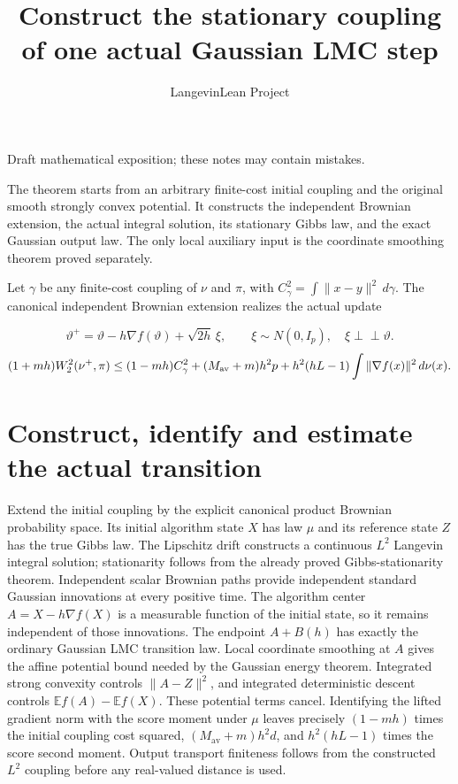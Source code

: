 \documentclass[11pt,a4paper]{article}
\title{\texorpdfstring{Construct the stationary coupling of one actual Gaussian LMC step}{Construct the stationary coupling of one actual Gaussian LMC step}}
\author{LangevinLean Project}
\date{}
\begin{document}
\maketitle
Draft mathematical exposition; these notes may contain mistakes.


The theorem starts from an arbitrary finite-cost initial coupling and the original smooth strongly convex potential. It constructs the independent Brownian extension, the actual integral solution, its stationary Gibbs law, and the exact Gaussian output law. The only local auxiliary input is the coordinate smoothing theorem proved separately.



Let \(\gamma\) be any finite-cost coupling of \(\nu\) and \(\pi\), with \(C_\gamma^2=\int\|x-y\|^2\,d\gamma\). The canonical independent Brownian extension realizes the actual update


\[\vartheta^+=\vartheta-h\nabla f(\vartheta)+\sqrt{2h}\,\xi,\qquad\xi\sim N(0,I_p),\quad\xi\perp\!\!\!\perp\vartheta.\]
\[(1+mh)W_2^2(\nu^+,\pi)\le(1-mh)C_\gamma^2+(M_{\rm av}+m)h^2p+h^2(hL-1)\int\|\nabla f(x)\|^2\,d\nu(x).\]
\section{\texorpdfstring{Construct, identify and estimate the actual transition}{Construct, identify and estimate the actual transition}}


Extend the initial coupling by the explicit canonical product Brownian probability space. Its initial algorithm state \(X\) has law \(\mu\) and its reference state \(Z\) has the true Gibbs law. The Lipschitz drift constructs a continuous \(L^{2}\) Langevin integral solution; stationarity follows from the already proved Gibbs-stationarity theorem. Independent scalar Brownian paths provide independent standard Gaussian innovations at every positive time. The algorithm center \(A=X-h\nabla f(X)\) is a measurable function of the initial state, so it remains independent of those innovations. The endpoint \(A+B(h)\) has exactly the ordinary Gaussian LMC transition law. Local coordinate smoothing at \(A\) gives the affine potential bound needed by the Gaussian energy theorem. Integrated strong convexity controls \(\|A-Z\|^{2}\), and integrated deterministic descent controls \(\mathbb E f(A)-\mathbb E f(X)\). These potential terms cancel. Identifying the lifted gradient norm with the score moment under \(\mu\) leaves precisely \((1-mh)\) times the initial coupling cost squared, \((M_{\mathrm{av}}+m)h^{2}d\), and \(h^2(hL-1)\) times the score second moment. Output transport finiteness follows from the constructed \(L^{2}\) coupling before any real-valued distance is used.
\end{document}
